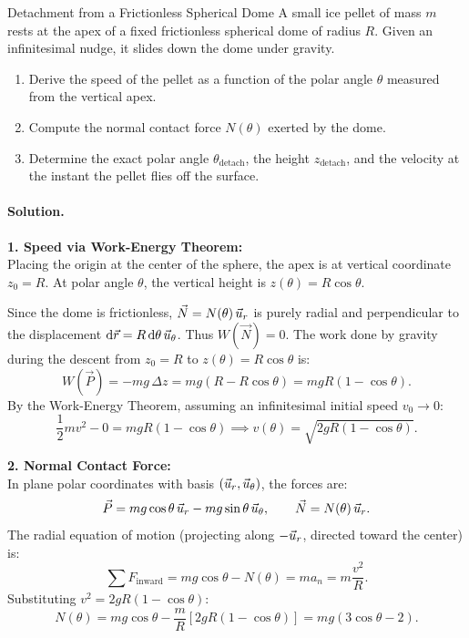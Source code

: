 \begin{workedexample}{Detachment from a Frictionless Spherical Dome}
A small ice pellet of mass $m$ rests at the apex of a fixed frictionless spherical dome of radius $R$. Given an infinitesimal nudge, it slides down the dome under gravity.
\begin{enumerate}[leftmargin=1.4em,itemsep=3pt]
  \item Derive the speed of the pellet as a function of the polar angle $\theta$ measured from the vertical apex.
  \item Compute the normal contact force $N(\theta)$ exerted by the dome.
  \item Determine the exact polar angle $\theta_{\text{detach}}$, the height $z_{\text{detach}}$, and the velocity at the instant the pellet flies off the surface.
\end{enumerate}

\paragraph{Solution.}
\textbf{1. Speed via Work-Energy Theorem:}\\
Placing the origin at the center of the sphere, the apex is at vertical coordinate $z_0 = R$. At polar angle $\theta$, the vertical height is $z(\theta) = R\cos\theta$.

Since the dome is frictionless, $\vec{N} = N(\theta)\,\vec{u}_r$ is purely radial and perpendicular to the displacement $\mathrm{d}\vec{r} = R\,\mathrm{d}\theta\,\vec{u}_\theta$. Thus $W(\vec{N}) = 0$.
The work done by gravity during the descent from $z_0 = R$ to $z(\theta) = R\cos\theta$ is:
\[
W(\vec{P}) = -mg\,\Delta z = mg(R - R\cos\theta) = mgR(1 - \cos\theta).
\]
By the Work-Energy Theorem, assuming an infinitesimal initial speed $v_0 \to 0$:
\[
\frac{1}{2}mv^2 - 0 = mgR(1 - \cos\theta) \implies v(\theta) = \sqrt{2gR(1 - \cos\theta)}.
\]

\textbf{2. Normal Contact Force:}\\
In plane polar coordinates with basis $(\vec{u}_r, \vec{u}_\theta)$, the forces are:
\[
\vec{P} = mg\cos\theta\,\vec{u}_r - mg\sin\theta\,\vec{u}_\theta, \qquad \vec{N} = N(\theta)\,\vec{u}_r.
\]
The radial equation of motion (projecting along $-\vec{u}_r$, directed toward the center) is:
\[
\sum F_{\text{inward}} = mg\cos\theta - N(\theta) = m a_n = m \frac{v^2}{R}.
\]
Substituting $v^2 = 2gR(1 - \cos\theta)$:
\[
N(\theta) = mg\cos\theta - \frac{m}{R}\left[ 2gR(1 - \cos\theta) \right] = mg(3\cos\theta - 2).
\]


\end{workedexample}
